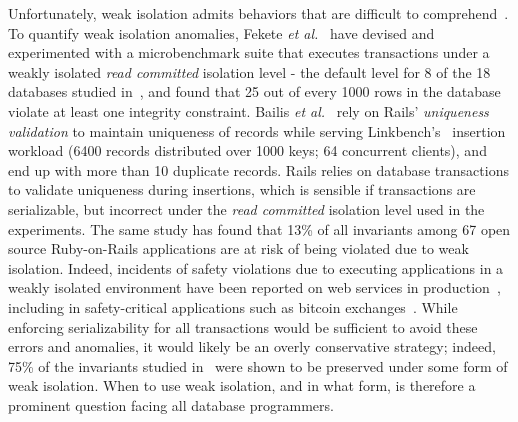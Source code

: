 Unfortunately, weak isolation admits behaviors that are difficult to
comprehend~\cite{berenson}. To quantify weak isolation anomalies,
Fekete \emph{et al.}~\cite{feketevldb09} have devised and experimented
with a microbenchmark suite that executes transactions under a weakly
isolated \emph{read committed} isolation level - the default level for
8 of the 18 databases studied in~\cite{bailishotos}, and found that 25
out of every 1000 rows in the database violate at least one integrity
constraint. Bailis \emph{et al.}~\cite{bailisferal} rely on Rails'
\emph{uniqueness validation} to maintain uniqueness of records while
serving Linkbench's~\cite{linkbench} insertion workload (6400 records
distributed over 1000 keys; 64 concurrent clients), and end up with
more than 10 duplicate records. Rails relies on database transactions
to validate uniqueness during insertions, which is sensible if
transactions are serializable, but incorrect under the \emph{read
  committed} isolation level used in the experiments. The same study
has found that 13\% of all invariants among 67 open source
Ruby-on-Rails applications are at risk of being violated due to weak
isolation. Indeed, incidents of safety violations due to executing
applications in a weakly isolated environment have been reported on
web services in production~\cite{starbucksbug, scimedbug}, including
in safety-critical applications such as bitcoin
exchanges~\cite{poloniexbug, bitcoinbug}. While enforcing
serializability for all transactions would be sufficient to avoid
these errors and anomalies, it would likely be an overly conservative
strategy; indeed, 75\% of the invariants studied in~\cite{bailisferal}
were shown to be preserved under some form of weak isolation.  When to
use weak isolation, and in what form, is therefore a prominent
question facing all database programmers.

